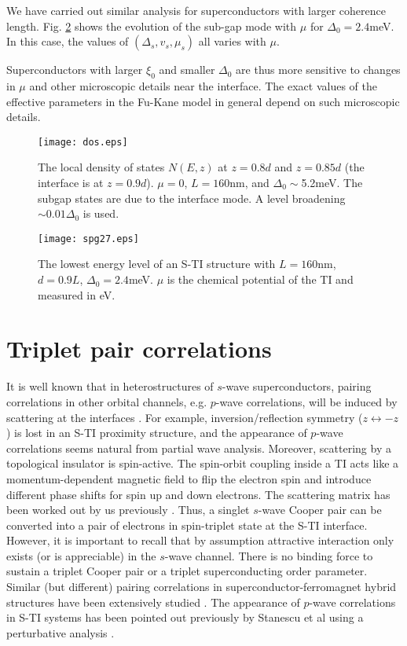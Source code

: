 \documentclass[12pt,twocolumn]{article}
\begin{document}
We have carried out similar analysis for superconductors with larger
coherence length. Fig. \ref{level-27} shows the evolution of
the sub-gap mode with $\mu$ for $\Delta_0=2.4$meV. In this case,
the values of $(\Delta_s,v_s,\mu_s)$ all varies with $\mu$. 

Superconductors with larger $\xi_0$ and smaller $\Delta_0$ are thus more sensitive to changes in $\mu$ and other microscopic details near the interface. The exact values of the effective parameters  in the Fu-Kane model in general depend on such microscopic details.

\begin{figure}
\texttt{[image: dos.eps]}
\caption{The local density of states $N(E,z)$
at $z=0.8d$ and $z=0.85d$ (the interface is at $z=0.9d$).
$\mu=0$, $L=160$nm, and $\Delta_0\sim$5.2meV. The subgap
states are due to the interface mode. A level broadening
$\sim 0.01\Delta_0$ is used.
}\label{dos}
\end{figure}

\begin{figure}
\texttt{[image: spg27.eps]}
\caption{The lowest energy level of an S-TI structure with $L=160$nm,
$d=0.9L$, $\Delta_0=2.4$meV. $\mu$ is the chemical potential of the TI and
measured in eV.}\label{level-27}
\end{figure}

\section{Triplet pair correlations}

It is well known that in heterostructures of $s$-wave superconductors,
pairing correlations in other orbital channels, e.g. $p$-wave correlations, 
will be induced by scattering at the interfaces \cite{esch,tanaka}. For example,
inversion/reflection symmetry ($z\leftrightarrow -z$) is lost in an S-TI proximity 
structure, and the appearance of $p$-wave correlations seems natural from
 partial wave analysis. Moreover, scattering by a topological insulator is 
spin-active. The spin-orbit coupling inside a TI acts like a momentum-dependent
magnetic field to flip the electron spin and introduce different phase shifts
for spin up and down electrons. The scattering matrix has been worked out by us 
previously \cite{zhao}. Thus, a singlet $s$-wave Cooper pair can be converted into a pair
of electrons in spin-triplet state at the S-TI interface.
However, it is important to recall that by assumption attractive interaction only exists
(or is appreciable) in the $s$-wave channel. There is no binding force
to sustain a triplet Cooper pair or a triplet superconducting order parameter. 
%
Similar (but different) pairing correlations in superconductor-ferromagnet
hybrid structures have been extensively studied \cite{esch}. 
The appearance of $p$-wave correlations in S-TI systems
has been pointed out previously by Stanescu et al using a perturbative analysis \cite{stan}.
\end{document}

